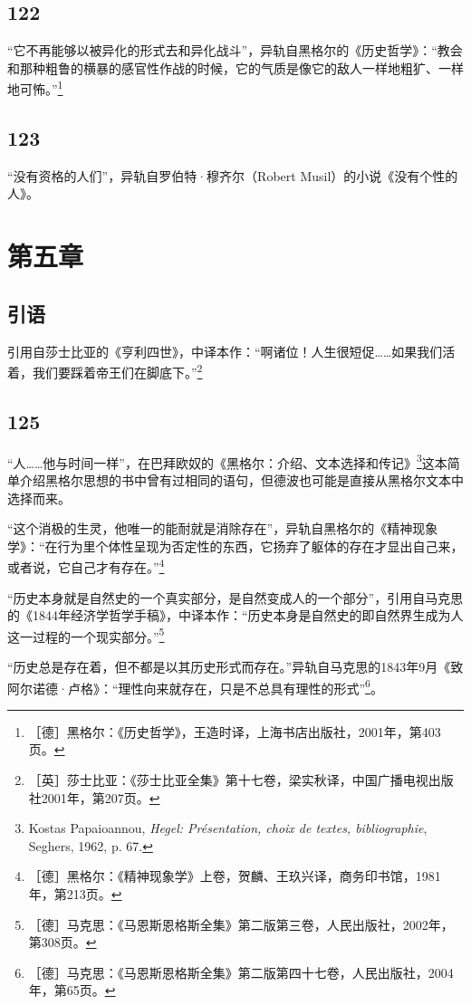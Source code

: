 \documentclass[fontset=fandol, a4paper, 12pt, openright]{ctexbook}
\begin{document}
\subsection*{122}
“它不再能够以被异化的形式去和异化战斗”，异轨自黑格尔的《历史哲学》：“教会和那种粗鲁的横暴的感官性作战的时候，它的气质是像它的敌人一样地粗犷、一样地可怖。”\footnote{［德］黑格尔：《历史哲学》，王造时译，上海书店出版社，2001年，第403页。}

\subsection*{123}
“没有资格的人们”，异轨自罗伯特·穆齐尔（Robert Musil）的小说《没有个性的人》。

\section*{第五章}

\subsection*{引语}
引用自莎士比亚的《亨利四世》，中译本作：“啊诸位！人生很短促……如果我们活着，我们要踩着帝王们在脚底下。”\footnote{［英］莎士比亚：《莎士比亚全集》第十七卷，梁实秋译，中国广播电视出版社2001年，第207页。}

\subsection*{125}
“人……他与时间一样”，在巴拜欧奴的《黑格尔：介绍、文本选择和传记》\footnote{Kostas Papaioannou, \textit{Hegel: Présentation, choix de textes, bibliographie}, Seghers, 1962, p. 67.}这本简单介绍黑格尔思想的书中曾有过相同的语句，但德波也可能是直接从黑格尔文本中选择而来。

“这个消极的生灵，他唯一的能耐就是消除存在”，异轨自黑格尔的《精神现象学》：“在行为里个体性呈现为否定性的东西，它扬弃了躯体的存在才显出自己来，或者说，它自己才有存在。”\footnote{［德］黑格尔：《精神现象学》上卷，贺麟、王玖兴译，商务印书馆，1981年，第213页。}

“历史本身就是自然史的一个真实部分，是自然变成人的一个部分”，引用自马克思的《1844年经济学哲学手稿》，中译本作：“历史本身是自然史的即自然界生成为人这一过程的一个现实部分。”\footnote{［德］马克思：《马恩斯恩格斯全集》第二版第三卷，人民出版社，2002年，第308页。}

“历史总是存在着，但不都是以其历史形式而存在。”异轨自马克思的1843年9月《致阿尔诺德·卢格》：“理性向来就存在，只是不总具有理性的形式”\footnote{［德］马克思：《马恩斯恩格斯全集》第二版第四十七卷，人民出版社，2004年，第65页。}。
\end{document}
